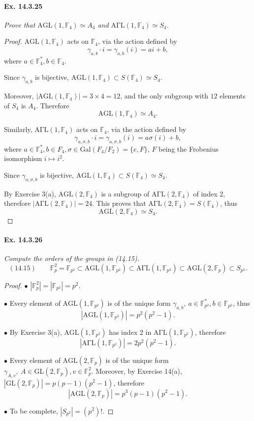\documentclass[11pt,a4paper]{article}
\newcommand{\F}{\mathbb{F}}
\newcommand{\Gal}{\mathrm{Gal}}
\begin{document}
{\paragraph{Ex. 14.3.25}{\it Prove that $\mathrm{AGL}(1,\F_4) \simeq A_4$ and $\mathrm{A\Gamma L}(1,\F_4) \simeq S_4$.
}
\begin{proof}
$\mathrm{AGL}(1,\F_4)$ acts on $\F_4$, via the action defined by $$\gamma_{a,b} \cdot i = \gamma_{a,b}(i) = ai +b,$$ where $a \in \F_4^*, b \in \F_4$.

Since $\gamma_{a,b}$ is bijective, $\mathrm{AGL}(1,\F_4) \subset S(\F_4) \simeq S_4$.

Moreover, $|\mathrm{AGL}(1,\F_4)| = 3 \times 4 = 12$, and the only subgroup with $12$ elements of $S_4$ is $A_4$. Therefore 
$$\mathrm{AGL}(1,\F_4) \simeq A_4.$$

Similarly, $\mathrm{A\Gamma L}(1,\F_4)$ acts on $\F_4$, via the action defined by 
$$\gamma_{a,\sigma,b} \cdot i = \gamma_{a,\sigma,b}(i) = a \sigma(i) + b,$$
where $a \in \F_4^*, b \in F_4, \sigma \in \Gal(F_4/F_2) = \{e,F\}$, $F$ being the Frobenius isomorphism $i \mapsto i^2$.

Since $\gamma_{a,\sigma,b}$ is bijective, $\mathrm{AGL}(1,\F_4) \subset S(\F_4) \simeq S_4$.

By Exercise 3(a), $\mathrm{AGL}(2,\F_4)$ is a subgroup of $\mathrm{A\Gamma L}(2,\F_4)$ of index 2, therefore $|\mathrm{A\Gamma L}(2,\F_4) | = 24$. This proves that $\mathrm{A\Gamma L}(2,\F_4) = S(\F_4)$, thus
$$\mathrm{AGL}(2,\F_4) \simeq S_4.$$
\end{proof}

\paragraph{Ex. 14.3.26}{\it Compute the orders of the groups in (14.15).
}
$$(14.15)\qquad \F_p^2 = \F_{p^2}  \subset \mathrm{AGL}(1,\F_{p^2}) \subset \mathrm{A\Gamma L}(1,\F_{p^2}) \subset \mathrm{AGL}(2,\F_p) \subset S_{p^2}.$$
\begin{proof}
 \item[$\bullet$] $|\F_p^2| = |\F_{p^2}| = p^2.$
 \item[$\bullet$] Every element of $\mathrm{AGL}(1,\F_{p^2})$ is of the unique form $\gamma_{a,b},\  a \in \F_{p^2}^*, b \in \F_{p^2}$, thus
  $$|\mathrm{AGL}(1,\F_{p^2})| = p^2(p^2-1).$$
   \item[$\bullet$] By Exercise 3(a), $\mathrm{AGL}(1,\F_{p^2})$ has index 2 in  $\mathrm{A\Gamma L}(1,\F_{p^2})$, therefore
   $$| \mathrm{A\Gamma L}(1,\F_{p^2})| = 2p^2(p^2-1).$$
   \item[$\bullet$] Every element of $\mathrm{AGL}(2,\F_{p})$ is of the unique form $\gamma_{A,v},\  A \in \mathrm{GL}(2,\F_p), v \in \F_{p}^2$.
   Moreover, by Exercise 14(a), $|\mathrm{GL}(2,\F_p)| = p(p-1)(p^2-1)$, therefore
   $$|\mathrm{AGL}(2,\F_{p})| = p^3(p-1)(p^2-1).$$
   \item[$\bullet$]  To be complete, $|S_{p^2}| = (p^2)!$.
\end{proof}

}
\end{document}
